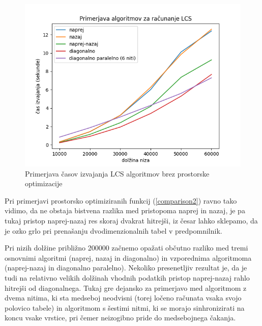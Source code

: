 \documentclass[a4paper,12pt,openright]{book}
\begin{document}
\begin{figure}[htb]
\begin{center}
\includegraphics[width=1.0\textwidth]{plots/LCStotal.png}
\end{center}
\caption{Primerjava časov izvajanja LCS algoritmov brez prostorske optimizacije}
\label{comparison1}
\end{figure}

Pri primerjavi prostorsko optimiziranih funkcij (\ref{comparison2}) ravno tako vidimo, da ne obstaja bistvena razlika med pristopoma naprej in nazaj, je pa tukaj pristop naprej-nazaj res skoraj dvakrat hitrejši, iz česar lahko sklepamo, da je ozko grlo pri prenašanju dvodimenzionalnih tabel v predpomnilnik. 

Pri nizih dolžine približno 200000 začnemo opažati občutno razliko med tremi osnovnimi algoritmi (naprej, nazaj in diagonalno) in vzporednima algoritmoma (naprej-nazaj in diagonalno paralelno). Nekoliko presenetljiv rezultat je, da je tudi na relativno velikih dolžinah vhodnih podatkih pristop naprej-nazaj rahlo hitrejši od diagonalnega. Tukaj gre dejansko za primerjavo med algoritmom z dvema nitima, ki sta medseboj neodvisni (torej ločeno računata vsaka svojo polovico tabele) in algoritmom s šestimi nitmi, ki se morajo sinhronizirati na koncu vsake vrstice, pri čemer neizogibno pride do medsebojnega čakanja. 
\end{document}
